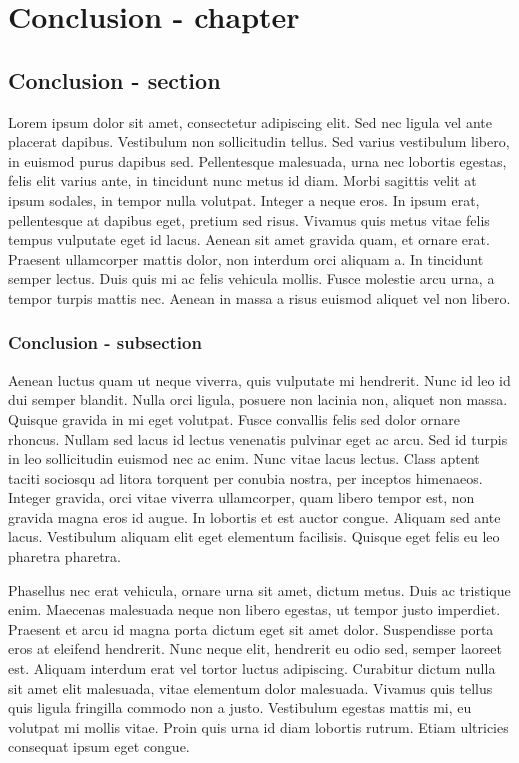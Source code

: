 \chapter{Conclusion - chapter}
\section{Conclusion - section}
Lorem ipsum dolor sit amet, consectetur adipiscing elit. Sed nec ligula vel
ante placerat dapibus. Vestibulum non sollicitudin tellus. Sed varius
vestibulum libero, in euismod purus dapibus sed. Pellentesque malesuada, urna
nec lobortis egestas, felis elit varius ante, in tincidunt nunc metus id diam.
Morbi sagittis velit at ipsum sodales, in tempor nulla volutpat. Integer a
neque eros. In ipsum erat, pellentesque at dapibus eget, pretium sed risus.
Vivamus quis metus vitae felis tempus vulputate eget id lacus. Aenean sit amet
gravida quam, et ornare erat. Praesent ullamcorper mattis dolor, non interdum
orci aliquam a. In tincidunt semper lectus. Duis quis mi ac felis vehicula
mollis. Fusce molestie arcu urna, a tempor turpis mattis nec. Aenean in massa a
risus euismod aliquet vel non libero.

\subsection{Conclusion - subsection}
Aenean luctus quam ut neque viverra, quis vulputate mi hendrerit. Nunc id leo
id dui semper blandit. Nulla orci ligula, posuere non lacinia non, aliquet non
massa. Quisque gravida in mi eget volutpat. Fusce convallis felis sed dolor
ornare rhoncus. Nullam sed lacus id lectus venenatis pulvinar eget ac arcu. Sed
id turpis in leo sollicitudin euismod nec ac enim. Nunc vitae lacus lectus.
Class aptent taciti sociosqu ad litora torquent per conubia nostra, per
inceptos himenaeos. Integer gravida, orci vitae viverra ullamcorper, quam
libero tempor est, non gravida magna eros id augue. In lobortis et est auctor
congue. Aliquam sed ante lacus. Vestibulum aliquam elit eget elementum
facilisis. Quisque eget felis eu leo pharetra pharetra.

Phasellus nec erat vehicula, ornare urna sit amet, dictum metus. Duis ac
tristique enim. Maecenas malesuada neque non libero egestas, ut tempor justo
imperdiet. Praesent et arcu id magna porta dictum eget sit amet dolor.
Suspendisse porta eros at eleifend hendrerit. Nunc neque elit, hendrerit eu
odio sed, semper laoreet est. Aliquam interdum erat vel tortor luctus
adipiscing. Curabitur dictum nulla sit amet elit malesuada, vitae elementum
dolor malesuada. Vivamus quis tellus quis ligula fringilla commodo non a justo.
Vestibulum egestas mattis mi, eu volutpat mi mollis vitae. Proin quis urna id
diam lobortis rutrum. Etiam ultricies consequat ipsum eget congue.

